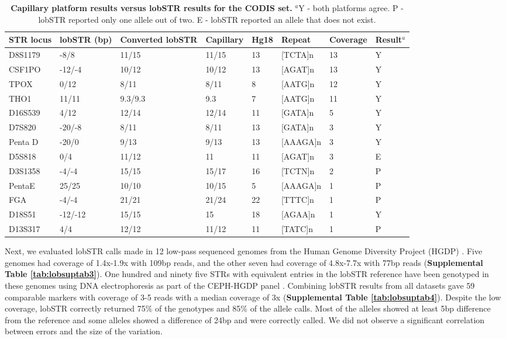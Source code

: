 \begin{table}[h!]
\centering
\label{tab:lobtab3}
\begin{adjustbox}{width=1\textwidth}
\begin{tabular}{l l l l l l l l}
\hline
STR locus & lobSTR (bp) & Converted lobSTR & Capillary & Hg18 & Repeat & Coverage & Result$^a$\\
\hline
D8S1179 & -8/8 & 11/15 & 11/15 & 13 & [TCTA]n & 13 & Y\\
CSF1PO & -12/-4 & 10/12 & 10/12 & 13 & [AGAT]n & 13 & Y\\
TPOX & 0/12 & 8/11 & 8/11 & 8 & [AATG]n & 12 & Y \\
THO1 & 11/11 & 9.3/9.3 & 9.3 & 7 & [AATG]n & 11 & Y\\
D16S539 & 4/12 & 12/14 & 12/14 & 11 & [GATA]n & 5 & Y\\
D7S820 & -20/-8 & 8/11 & 8/11 & 13 & [GATA]n & 3 & Y\\
Penta D & -20/0 & 9/13 & 9/13 & 13 & [AAAGA]n & 3 & Y\\
D5S818 & 0/4 & 11/12 & 11 & 11 & [AGAT]n & 3 & E \\
D3S1358 & -4/-4 & 15/15 & 15/17 & 16 & [TCTN]n & 2 & P\\
PentaE & 25/25 & 10/10 & 10/15 & 5 & [AAAGA]n & 1 & P \\
FGA & -4/-4 & 21/21 & 21/24 & 22 & [TTTC]n & 1 & P\\
D18S51 & -12/-12 & 15/15 & 15 & 18 & [AGAA]n & 1 & Y\\
D13S317 & 4/4 & 12/12 & 11/12 & 11 & [TATC]n & 1 & P\\
\hline
\end{tabular}
\end{adjustbox}
\caption{\textbf{Capillary platform results versus lobSTR results for the CODIS set.} $^a$Y - both platforms agree. P - lobSTR reported only one allele out of two. E - lobSTR reported an allele that does not exist.}
\end{table}

Next, we evaluated lobSTR calls made in 12 low-pass sequenced genomes from the Human Genome Diversity Project (HGDP) \cite{GreenKrauseBriggsEtAl2010,ReichGreenKircherEtAl2010}. Five genomes had coverage of 1.4x-1.9x with 109bp reads, and the other seven had coverage of 4.8x-7.7x with 77bp reads (\textbf{Supplemental Table \ref{tab:lobsuptab3}}). One hundred and ninety five STRs with equivalent entries in the lobSTR reference have been genotyped in these genomes using DNA electrophoresis as part of the CEPH-HGDP panel \cite{RamachandranDeshpandeRosemanEtAl2005,PembertonSandefurJakobssonEtAl2009}. Combining lobSTR results from all datasets gave 59 comparable markers with coverage of 3-5 reads with a median coverage of 3x (\textbf{Supplemental Table \ref{tab:lobsuptab4}}). Despite the low coverage, lobSTR correctly returned 75\% of the genotypes and 85\% of the allele calls. Most of the alleles showed at least 5bp difference from the reference and some alleles showed a difference of 24bp and were correctly called. We did not observe a significant correlation between errors and the size of the variation. 

